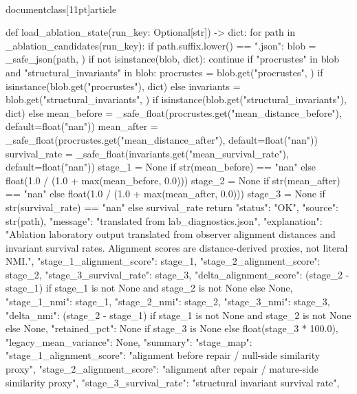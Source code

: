 \\documentclass[11pt]{article}
\begin{document}
\begin{CodeBlock}
{def load_ablation_state(run_key: Optional[str]) -> dict:
    for path in _ablation_candidates(run_key):
        if path.suffix.lower() == ".json":
            blob = _safe_json(path, {})
            if not isinstance(blob, dict):
                continue
            if "procrustes" in blob and "structural_invariants" in blob:
                procrustes = blob.get("procrustes", {}) if isinstance(blob.get("procrustes"), dict) else {}
                invariants = blob.get("structural_invariants", {}) if isinstance(blob.get("structural_invariants"), dict) else {}
                mean_before = _safe_float(procrustes.get("mean_distance_before"), default=float("nan"))
                mean_after = _safe_float(procrustes.get("mean_distance_after"), default=float("nan"))
                survival_rate = _safe_float(invariants.get("mean_survival_rate"), default=float("nan"))
                stage_1 = None if str(mean_before) == "nan" else float(1.0 / (1.0 + max(mean_before, 0.0)))
                stage_2 = None if str(mean_after) == "nan" else float(1.0 / (1.0 + max(mean_after, 0.0)))
                stage_3 = None if str(survival_rate) == "nan" else survival_rate
                return {
                    "status": "OK",
                    "source": str(path),
                    "message": "translated from lab_diagnostics.json",
                    "explanation": "Ablation laboratory output translated from observer alignment distances and invariant survival rates. Alignment scores are distance-derived proxies, not literal NMI.",
                    "stage_1_alignment_score": stage_1,
                    "stage_2_alignment_score": stage_2,
                    "stage_3_survival_rate": stage_3,
                    "delta_alignment_score": (stage_2 - stage_1) if stage_1 is not None and stage_2 is not None else None,
                    "stage_1_nmi": stage_1,
                    "stage_2_nmi": stage_2,
                    "stage_3_nmi": stage_3,
                    "delta_nmi": (stage_2 - stage_1) if stage_1 is not None and stage_2 is not None else None,
                    "retained_pct": None if stage_3 is None else float(stage_3 * 100.0),
                    "legacy_mean_variance": None,
                    "summary": {
                        "stage_map": {
                            "stage_1_alignment_score": "alignment before repair / null-side similarity proxy",
                            "stage_2_alignment_score": "alignment after repair / mature-side similarity proxy",
                            "stage_3_survival_rate": "structural invariant survival rate",
}}}}
\end{CodeBlock}
\end{document}
